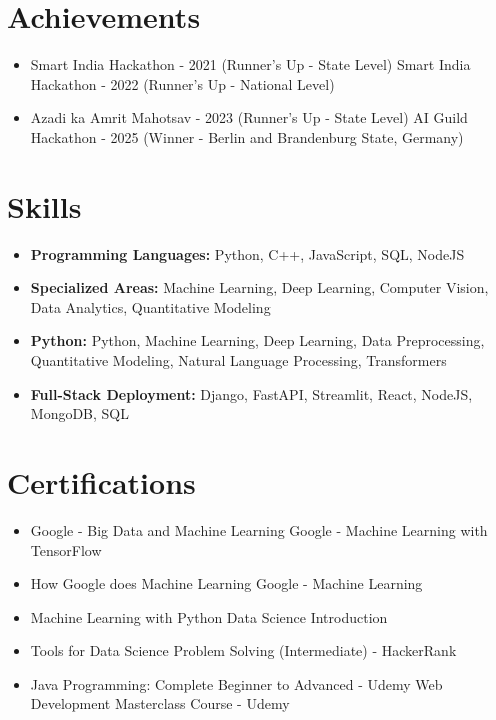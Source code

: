 \documentclass[a4paper,10pt]{article}
\begin{document}
\section*{Achievements}
\begin{itemize}
\item Smart India Hackathon - 2021 (Runner's Up - State Level) \hfill Smart India Hackathon - 2022 (Runner's Up - National Level)
\item Azadi ka Amrit Mahotsav - 2023 (Runner's Up - State Level) \hfill AI Guild Hackathon - 2025 (Winner - Berlin and Brandenburg State, Germany)
\end{itemize}

\section*{Skills}
\begin{itemize}
  \item \textbf{Programming Languages:} Python, C++, JavaScript, SQL, NodeJS
  \item \textbf{Specialized Areas:} Machine Learning, Deep Learning, Computer Vision, Data Analytics, Quantitative Modeling
  \item \textbf{Python:} Python, Machine Learning, Deep Learning, Data Preprocessing, Quantitative Modeling, Natural Language Processing, Transformers
  \item \textbf{Full-Stack Deployment:} Django, FastAPI, Streamlit, React, NodeJS, MongoDB, SQL
\end{itemize}

\section*{Certifications}
\begin{itemize}
\item Google - Big Data and Machine Learning \hfill Google - Machine Learning with TensorFlow
\item How Google does Machine Learning \hfill Google - Machine Learning
\item Machine Learning with Python \hfill Data Science Introduction
\item Tools for Data Science \hfill Problem Solving (Intermediate) - HackerRank
\item Java Programming: Complete Beginner to Advanced - Udemy \hfill Web Development Masterclass Course - Udemy
\end{itemize}
\end{document}
